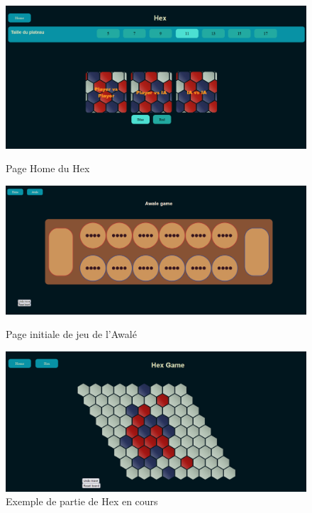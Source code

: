 \begin{figure}[!htb]
    \begin{minipage}{0.33\textwidth}
        \centering
        \includegraphics[width=\linewidth]{root/exemple_home}
        \caption{Page Home du Hex}\label{fig:exemple_home}
    \end{minipage}\hfill
    \begin{minipage}{0.33\textwidth}
        \centering
        \includegraphics[width=\linewidth]{root/awale_board.png}
        \caption{Page initiale de jeu de l'Awalé}\label{fig:awale_board}
    \end{minipage}\hfill
    \begin{minipage}{0.33\textwidth}
        \centering
        \includegraphics[width=\linewidth]{root/exemple_partie_hex}
        \caption{Exemple de partie de Hex en cours}\label{fig:hex_board}
    \end{minipage}
\end{figure}

